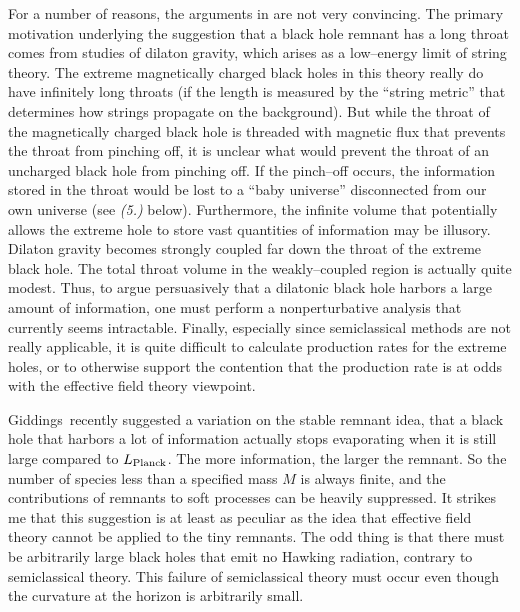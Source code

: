 For a number of reasons, the arguments in  are not very
convincing.
The primary motivation underlying the suggestion that a black hole remnant has
a long throat comes from studies of dilaton gravity, which arises as a
low--energy limit of string theory.  The extreme magnetically charged black
holes in this theory\lref{}\lref{}
really do have infinitely long throats (if the length is measured by the
``string metric'' that determines how strings propagate on the background).
But while the throat of the magnetically charged black hole is threaded with
magnetic flux that prevents the throat from pinching off, it is unclear what
would prevent the throat of an uncharged black hole from pinching off.  If the
pinch--off occurs,  the information stored in the throat would be lost to a
``baby universe'' disconnected from our own universe (see {\it (5.)} below).
Furthermore, the infinite volume that potentially allows the extreme hole to
store vast quantities of information may be illusory.  Dilaton gravity becomes
strongly coupled far down the throat of the extreme black hole.  The total
throat volume in the weakly--coupled region is actually quite modest.  Thus, to
argue persuasively that a dilatonic black hole harbors a large amount of
information, one must perform a nonperturbative analysis that currently seems
intractable.  Finally, especially since semiclassical methods are not really
applicable, it is quite difficult to calculate production rates for the extreme
holes, or to otherwise support the contention that the production rate is at
odds with the effective field theory viewpoint.

Giddings\giddings\ recently suggested a variation on the stable remnant idea,
that a
black hole that harbors a lot of information actually stops evaporating when it
is still large compared to $L_{\rm Planck}$.  The more information, the larger
the remnant.  So the number of species less than a specified mass $M$ is always
finite, and the contributions of remnants to soft processes can be heavily
suppressed.  It strikes me that this suggestion is at least as peculiar as the
idea that effective field theory cannot be applied to the tiny remnants.  The
odd thing is that there must be arbitrarily large black holes that emit no
Hawking radiation, contrary to semiclassical theory.  This failure of
semiclassical theory must occur even though the curvature at the horizon is
arbitrarily small.

